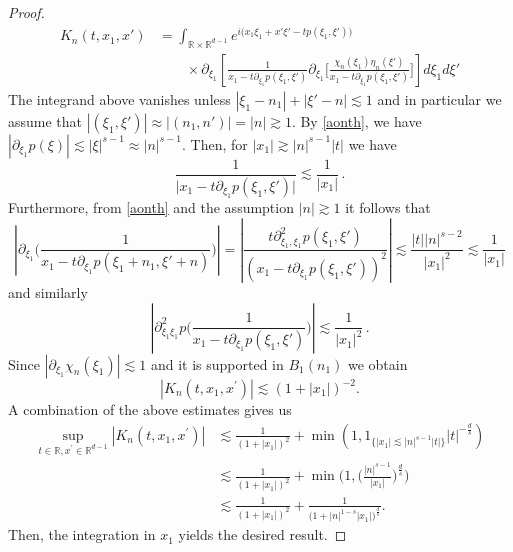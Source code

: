 \documentclass[10pt,leqno]{amsart}
\newcommand{\R}{\mathbb{R}} %
\numberwithin{equation}{section}
\begin{document}
\begin{proof}
\begin{align*}
K_n(t,x_1 ,x')
&= \int_{\R \times \R^{d-1}}  e^{i\big(x_1 \xi_1 +x' \xi'-t p (\xi_1, \xi') \big)} 
\\
&\qquad \times
\partial_{\xi_{1}} \left[ \frac{1}{x_1 - t\partial_{\xi_{1}}p(\xi_1, \xi')} 
\partial_{\xi_{1}}\Big[\frac{\chi_n(\xi_1) \eta_n (\xi')}{x_1 - t\partial_{\xi_{1}}p(\xi_1, \xi')} \Big]\right] d\xi_1 d\xi'
\end{align*}
The integrand above vanishes unless \(|\xi_{1}-n_{1}|+|\xi'-n|\lesssim1\) and in particular we assume that \(|(\xi_{1},\xi')|\approx|(n_{1},n')|=|n|\gtrsim1\).
By \eqref{aonth}, we have 
 $|\partial_{\xi_{1}}p(\xi)| \lesssim | \xi |^{s-1}\approx |n|^{s-1}$. Then, for  \(|x_{1}|\gtrsim|n|^{s-1}|t|\) we have 
\begin{equation*}
\frac{1}{\big|x_1 - t\partial_{\xi_{1}}p(\xi_1, \xi')\big|}\lesssim\frac{1}{|x_{1}|} \,.
\end{equation*}
Furthermore, from \eqref{aonth} and the assumption $|n| \gtrsim 1$ it follows that
\begin{equation*}
\left| \partial_{\xi_1} \Big( \frac{1}{x_1 - t\partial_{\xi_{1}}p(\xi_1+n_1, \xi' + n)} \Big) \right| =
\left| \frac{t\partial_{\xi_{1},\xi_{1}}^{2}p(\xi_1, \xi')}{(x_1 - t\partial_{\xi_{1}}p(\xi_1, \xi'))^2} \right|
\lesssim \frac{|t||n|^{s-2}}{|x_1|^{2}}
 \lesssim \frac{1}{|x_1|}
\end{equation*}
and similarly
$$
\left| \partial^2_{\xi_1\xi_1}p \Big( \frac{1}{x_1 - t\partial_{\xi_{1}}p(\xi_1, \xi')} \Big) \right|
 \lesssim \frac{1}{|x_1|^2} \,.
$$
Since $|\partial_{\xi_1} \chi_n(\xi_1)| \lesssim 1$ and it is supported in \(B_{1}(n_{1})\) we obtain
$$|K_n(t,x_1 ,x^\prime )|\lesssim    (1+ |x_1| )^{-2}.$$
A combination of the above estimates gives us
\begin{align*}
\sup_{t\in \R , x^\prime \in \R^{d-1}} |K_n (t,x_1, x^\prime)|& \lesssim \frac{1}{(1+ |x_1|)^{2}}  +\min (1 , 1_{\{|x_1| \lesssim |n|^{s - 1} |t|\} }  |t|^{-\frac{d}{s}})\\
& \lesssim \frac{1}{(1+ |x_1|)^{2}}  + \min \bigg(1 ,  \bigg(\frac{|n|^{s - 1}}{|x_1|}\bigg)^{\frac{d}{s} } \bigg)\\
&\lesssim \frac{1}{(1+ |x_1|)^{2}}  +\frac{1}{\Big(1+|n|^{1-s}|x_1|\Big)^{\frac{d}{s}}}
.
\end{align*}
Then, the integration in $x_1$ yields the desired result.
\end{proof}
\end{document}
